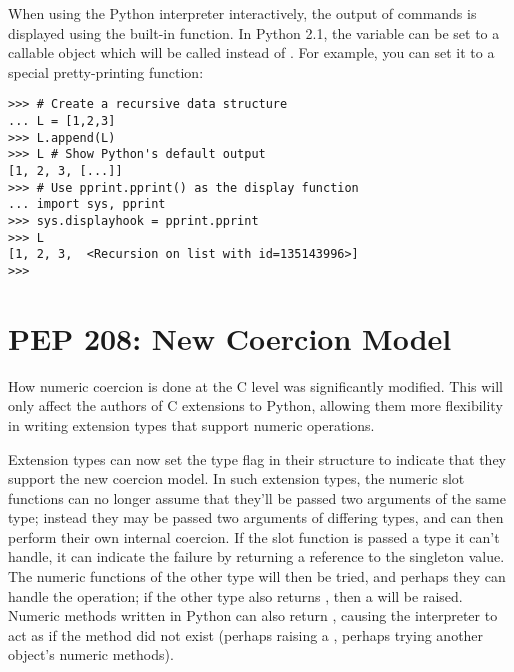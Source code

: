 \documentclass{howto}
\begin{document}
When using the Python interpreter interactively, the output of
commands is displayed using the built-in  function.
In Python 2.1, the variable  can be set to a
callable object which will be called instead of .
For example, you can set it to a special pretty-printing function:

\begin{verbatim}
>>> # Create a recursive data structure
... L = [1,2,3]
>>> L.append(L)
>>> L # Show Python's default output
[1, 2, 3, [...]]
>>> # Use pprint.pprint() as the display function
... import sys, pprint
>>> sys.displayhook = pprint.pprint
>>> L
[1, 2, 3,  <Recursion on list with id=135143996>]
>>>
\end{verbatim}

\begin{seealso}


\end{seealso}

\section{PEP 208: New Coercion Model}

How numeric coercion is done at the C level was significantly
modified.  This will only affect the authors of C extensions to
Python, allowing them more flexibility in writing extension types that
support numeric operations.

Extension types can now set the type flag 
in their  structure to indicate that they support
the new coercion model.  In such extension types, the numeric slot
functions can no longer assume that they'll be passed two arguments of
the same type; instead they may be passed two arguments of differing
types, and can then perform their own internal coercion.  If the slot
function is passed a type it can't handle, it can indicate the failure
by returning a reference to the  singleton
value.  The numeric functions of the other type will then be tried,
and perhaps they can handle the operation; if the other type also
returns , then a  will be
raised.  Numeric methods written in Python can also return
, causing the interpreter to act as if the
method did not exist (perhaps raising a , perhaps
trying another object's numeric methods).
\end{document}
